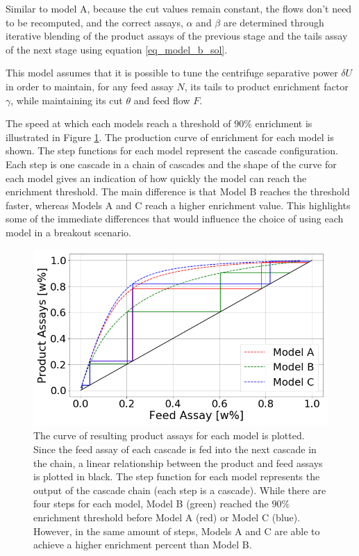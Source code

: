 Similar to model A, because the cut values remain constant, the flows don't
need to be recomputed, and the correct assays, $\alpha$ and $\beta$ are
determined through iterative blending of the product assays of the previous
stage and the tails assay of the next stage using equation
\eqref{eq_model_b_sol}.

This model assumes that it is possible to tune the centrifuge separative power
$\delta U$ in order to maintain, for any feed assay $N$, its tails to product
enrichment factor $\gamma$, while maintaining its cut $\theta$ and feed flow
$F$.

The speed at which each models reach a threshold of $90\%$ enrichment is
illustrated in Figure \ref{fig:model_comparison}. The production curve of
enrichment for each model is shown. The step functions for each model represent
the cascade configuration. Each step is one cascade in a chain of cascades and
the shape of the curve for each model gives an indication of how quickly the model
can reach the enrichment threshold. The main difference is that Model B reaches
the threshold faster, whereas Models A and C reach a higher enrichment value.
This highlights some of the immediate differences that would influence the choice
of using each model in a breakout scenario.

\begin{figure}[ht]
    \centering
    \includegraphics[scale=0.4]{ModelComparison}
    \caption{The curve of resulting product assays for each model is plotted.
    Since the feed assay of each cascade is fed into the next cascade in the
    chain, a linear relationship between the product and feed assays is plotted
    in black. The step function for each model represents the output of the
    cascade chain (each step is a cascade). While there are four steps for each
    model, Model B (green) reached the $90\%$ enrichment threshold before
    Model A (red) or Model C (blue). However, in the same amount of steps, Models
    A and C are able to achieve a higher enrichment percent than Model B.}
    \label{fig:model_comparison}
\end{figure}
